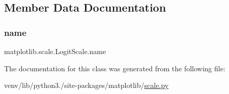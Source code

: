 \subsection{Member Data Documentation}
\mbox{\label{classmatplotlib_1_1scale_1_1LogitScale_af0ef0ee2181fb6a5fb7a955a78c5d5a2}} 
\subsubsection{\texorpdfstring{name}{name}}
{\footnotesize\ttfamily matplotlib.\+scale.\+Logit\+Scale.\+name\hspace{0.3cm}{\ttfamily [static]}}



The documentation for this class was generated from the following file\+:\begin{DoxyCompactItemize}
\item 
venv/lib/python3./site-\/packages/matplotlib/\hyperlink{scale_8py}{scale.\+py}\end{DoxyCompactItemize}
